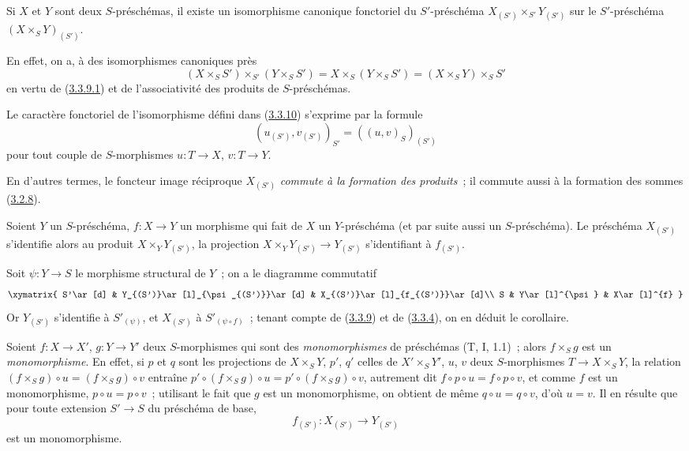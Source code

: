 \begin{corollary}[3.3.10]
\label{I.3.3.10-fr}
Si $X$ et $Y$ sont deux $S$-préschémas, il existe un isomorphisme canonique
fonctoriel du $S'$-préschéma $X_{(S')}\times_{S'}Y_{(S')}$ sur le
$S'$-préschéma $(X\times_S Y)_{(S')}$.
\end{corollary}

En effet, on a, à des isomorphismes canoniques près
\[
  (X\times_S S')\times_{S'}(Y\times_S S')
  =X\times_S(Y\times_S S')=(X\times_S Y)\times_S S'
\]
en vertu de (\hyperref[I.3.3.9.1-fr]{3.3.9.1}) et de l'associativité des
produits de $S$-préschémas.

Le caractère fonctoriel de l'isomorphisme défini dans
(\hyperref[I.3.3.10-fr]{3.3.10}) s'exprime par la formule
\begin{equation}
  (u_{(S')},v_{(S')})_{S'}=((u,v)_S)_{(S')}
  \tag{3.3.10.1}\label{I.3.3.10.1-fr}
\end{equation}
pour tout couple de $S$-morphismes $u:T\to X$, $v:T\to Y$.

En d'autres termes, le foncteur image réciproque $X_{(S')}$
\emph{commute à la formation des produits}~; il commute aussi à la formation
des sommes (\hyperref[I.3.2.8-fr]{3.2.8}).

\begin{corollary}[3.3.11]
\label{I.3.3.11-fr}
Soient $Y$ un $S$-préschéma, $f:X\to Y$ un morphisme qui fait de $X$ un
$Y$-préschéma (et par suite aussi un $S$-préschéma). Le préschéma $X_{(S')}$
s'identifie alors au produit $X\times_Y Y_{(S')}$, la projection
$X\times_Y Y_{(S')}\to Y_{(S')}$ s'identifiant à $f_{(S')}$.
\end{corollary}

Soit $\psi:Y\to S$ le morphisme structural de $Y$~; on a le diagramme
commutatif
\label{I.3.3.11.diagram-fr}
\[
  \xymatrix{
    S'\ar[d] &
    Y_{(S')}\ar[l]_{\psi_{(S')}}\ar[d] &
    X_{(S')}\ar[l]_{f_{(S')}}\ar[d]\\
    S & Y\ar[l]^{\psi} & X\ar[l]^{f}
  }
\]
Or $Y_{(S')}$ s'identifie à $S'_{(\psi)}$, et $X_{(S')}$ à
$S'_{(\psi\circ f)}$~; tenant compte de (\hyperref[I.3.3.9-fr]{3.3.9}) et de
(\hyperref[I.3.3.4-fr]{3.3.4}), on en déduit le corollaire.

\begin{env}[3.3.12]
\label{I.3.3.12-fr}
Soient $f:X\to X'$, $g:Y\to Y'$ deux $S$-morphismes qui sont des
\emph{monomorphismes} de préschémas (T, I, 1.1)~; alors $f\times_S g$ est un
\emph{monomorphisme}. En effet, si $p$ et $q$ sont les projections de
$X\times_S Y$, $p'$, $q'$ celles de $X'\times_S Y'$, $u$, $v$ deux
$S$-morphismes $T\to X\times_S Y$, la relation
$(f\times_S g)\circ u=(f\times_S g)\circ v$ entraîne
$p'\circ(f\times_S g)\circ u=p'\circ(f\times_S g)\circ v$, autrement dit
$f\circ p\circ u=f\circ p\circ v$, et comme $f$ est un monomorphisme,
$p\circ u=p\circ v$~; utilisant le fait que $g$ est un monomorphisme, on
obtient de même $q\circ u=q\circ v$, d'où $u=v$.
Il en résulte que pour toute extension $S'\to S$ du préschéma de base,
\label{I.3.3.12.base-change-monomorphism-fr}
\[
  f_{(S')}:X_{(S')}\to Y_{(S')}
\]
est un monomorphisme.
\end{env}

